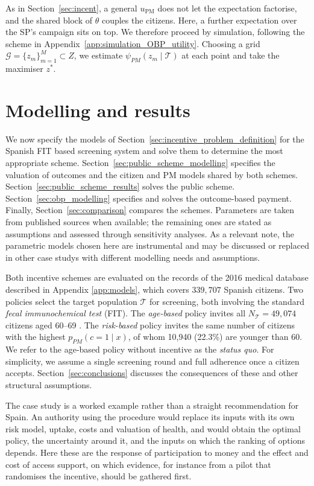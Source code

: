 \documentclass[12pt]{article}
\begin{document}
As in Section~\ref{sec:incent}, a general $u_{\text{PM}}$ does not let the expectation factorise, and the shared block of $\theta$ couples the citizens. Here, a further expectation over the SP's campaign sits on top. We therefore proceed by simulation, following the scheme in Appendix~\ref{app:simulation_OBP_utility}. Choosing a grid $\mathcal{G} = \{z_m\}_{m=1}^{M} \subset Z$, we estimate $\psi_{PM}(z_m \mid \mathcal{T})$ at each point and take the maximiser $z^{*}$.


\section{Modelling and results} \label{sec:modelling_results}
We now specify the models of Section~\ref{sec:incentive_problem_definition} for the Spanish FIT based screening system and solve them to determine the most appropriate scheme. Section~\ref{sec:public_scheme_modelling} specifies the valuation of outcomes and the citizen and PM models shared by both schemes. Section~\ref{sec:public_scheme_results} solves the public scheme. Section~\ref{sec:obp_modelling} specifies and solves the outcome-based payment. Finally, Section~\ref{sec:comparison} compares the schemes. Parameters are taken from published sources when available; the remaining ones are stated as assumptions and assessed through sensitivity analyses. As a relevant note, the parametric models chosen here are instrumental and may be discussed or replaced in other case studys with different modelling needs and assumptions.

Both incentive schemes are evaluated on the records of the 2016 medical database described in Appendix \ref{app:models}, which covers $339{,}707$ Spanish citizens. Two policies select the target population $\mathcal{T}$ for screening, both involving the standard \emph{fecal immunochemical test} (FIT). The \emph{age-based} policy invites all $N_{\mathcal{T}} = 49{,}074$ citizens aged 60--69%
. The \emph{risk-based} policy invites the same number of citizens with the highest $p_{PM}(c=1 \mid x)$, of whom 10{,}940 (22.3\%) are younger than 60. We refer to the age-based policy without incentive as the \emph{status quo}. For simplicity, we assume a single screening round and full adherence once a citizen accepts. Section~\ref{sec:conclusions} discusses the consequences of these and other structural assumptions.

The case study is a worked example rather than a straight recommendation for Spain. An authority using the procedure would replace its inputs with its own risk model, uptake, costs and valuation of health, and would obtain the optimal policy, the uncertainty around it, and the inputs on which the ranking of options depends. Here these are the response of participation to money and the effect and cost of access support, on which evidence, for instance from a pilot that randomises the incentive, should be gathered first.
\end{document}
